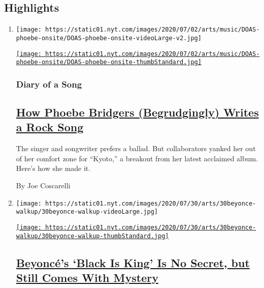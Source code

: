 \hypertarget{highlights}{%
\subsection{Highlights}\label{highlights}}

\begin{enumerate}
\def\labelenumi{\arabic{enumi}.}
\item
  \texttt{[image: https://static01.nyt.com/images/2020/07/02/arts/music/DOAS-phoebe-onsite/DOAS-phoebe-onsite-videoLarge-v2.jpg]}

  \href{/2020/07/30/arts/music/phoebe-bridgers-kyoto.html}{\texttt{[image: https://static01.nyt.com/images/2020/07/02/arts/music/DOAS-phoebe-onsite/DOAS-phoebe-onsite-thumbStandard.jpg]}}

  \hypertarget{diary-of-a-song}{%
  \subsubsection{Diary of a Song}\label{diary-of-a-song}}

  \hypertarget{how-phoebe-bridgers-begrudgingly-writes-a-rock-song}{%
  \subsection{\texorpdfstring{\href{/2020/07/30/arts/music/phoebe-bridgers-kyoto.html}{How
  Phoebe Bridgers (Begrudgingly) Writes a Rock
  Song}}{How Phoebe Bridgers (Begrudgingly) Writes a Rock Song}}\label{how-phoebe-bridgers-begrudgingly-writes-a-rock-song}}

  The singer and songwriter prefers a ballad. But collaborators yanked
  her out of her comfort zone for ``Kyoto,'' a breakout from her latest
  acclaimed album. Here's how she made it.

  By Joe Coscarelli
\item
  \texttt{[image: https://static01.nyt.com/images/2020/07/30/arts/30beyonce-walkup/30beyonce-walkup-videoLarge.jpg]}

  \href{/2020/07/30/arts/music/beyonce-black-is-king.html}{\texttt{[image: https://static01.nyt.com/images/2020/07/30/arts/30beyonce-walkup/30beyonce-walkup-thumbStandard.jpg]}}

  \hypertarget{beyoncuxe9s-black-is-king-is-no-secret-but-still-comes-with-mystery}{%
  \subsection{\texorpdfstring{\href{/2020/07/30/arts/music/beyonce-black-is-king.html}{Beyoncé's
  `Black Is King' Is No Secret, but Still Comes With
  Mystery}}{Beyoncé's `Black Is King' Is No Secret, but Still Comes With Mystery}}\label{beyoncuxe9s-black-is-king-is-no-secret-but-still-comes-with-mystery}}


\end{enumerate}

